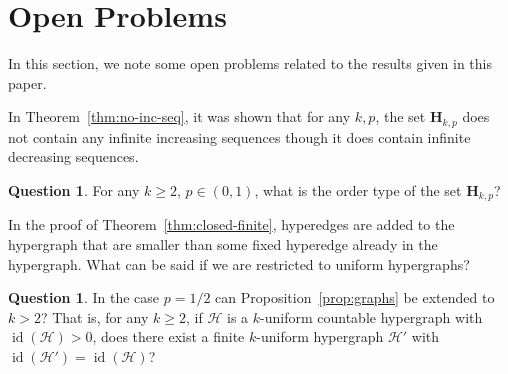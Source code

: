 \documentclass[11pt,reqno]{amsart}
\theoremstyle{definition}
\newtheorem{question}[theorem]{Question}
\begin{document}
\section{Open Problems}\label{sec:open}

In this section, we note some open problems related to the results given in this paper.

In Theorem~\ref{thm:no-inc-seq}, it was shown that for any $k, p$, the set $\mathbf{H}_{k,p}$ does not contain any infinite increasing sequences though it does contain infinite decreasing sequences.

\begin{question}
For any $k \geq 2$, $p \in (0,1)$, what is the order type of the set $\mathbf{H}_{k,p}$?
\end{question}

In the proof of Theorem~\ref{thm:closed-finite}, hyperedges are added to the hypergraph that are smaller than some fixed hyperedge already in the hypergraph.  What can be said if we are restricted to uniform hypergraphs?

\begin{question}
In the case $p = 1/2$ can Proposition~\ref{prop:graphs} be extended to $k > 2$?  That is, for any $k \geq 2$, if $\mathcal{H}$ is a $k$-uniform countable hypergraph with ${\operatorname{id}}(\mathcal{H}) > 0$, does there exist a finite $k$-uniform hypergraph $\mathcal{H}'$ with ${\operatorname{id}}(\mathcal{H}') = {\operatorname{id}}(\mathcal{H})$?
\end{question}
\end{document}
